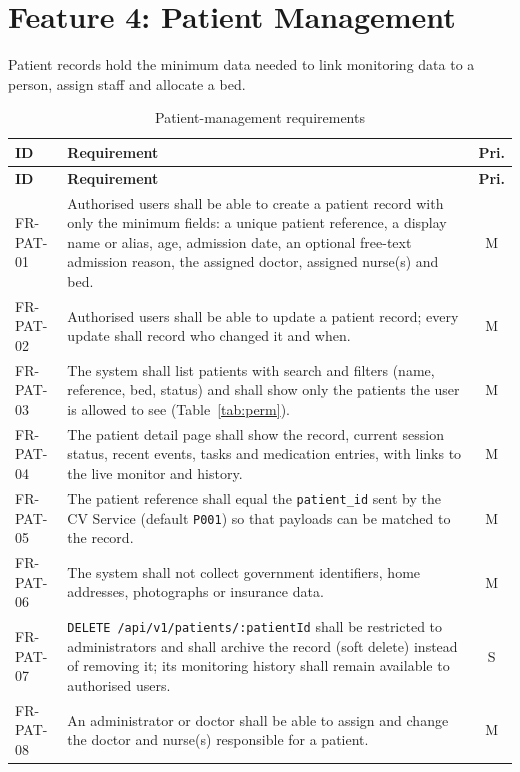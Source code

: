 \documentclass[a4paper,11pt]{scrreprt}
\makeatletter
\newenvironment{reqtable}[1]{%
  \small
  \begin{longtable}{@{}>{\ttfamily\footnotesize}p{2.55cm}>{\raggedright\arraybackslash}p{10.7cm}c@{}}
  \caption{#1}\\
  \toprule \textbf{ID} & \textbf{Requirement} & \textbf{Pri.}\\ \midrule
  \endfirsthead
  \toprule \textbf{ID} & \textbf{Requirement} & \textbf{Pri.}\\ \midrule
  \endhead
  \bottomrule
  \endfoot
}{%
  \end{longtable}\normalsize
}
\newcommand{\req}[3]{#1 & #2 & #3 \\ \midrule}
\newcommand{\code}[1]{\texttt{#1}}
\makeatother
\begin{document}
\section{Feature 4: Patient Management}
Patient records hold the minimum data needed to link monitoring data to a person, assign staff and allocate a bed.
\begin{reqtable}{Patient-management requirements}
\req{FR-PAT-01}{Authorised users shall be able to create a patient record with only the minimum fields: a unique patient reference, a display name or alias, age, admission date, an optional free-text admission reason, the assigned doctor, assigned nurse(s) and bed.}{M}
\req{FR-PAT-02}{Authorised users shall be able to update a patient record; every update shall record who changed it and when.}{M}
\req{FR-PAT-03}{The system shall list patients with search and filters (name, reference, bed, status) and shall show only the patients the user is allowed to see (Table~\ref{tab:perm}).}{M}
\req{FR-PAT-04}{The patient detail page shall show the record, current session status, recent events, tasks and medication entries, with links to the live monitor and history.}{M}
\req{FR-PAT-05}{The patient reference shall equal the \code{patient_id} sent by the CV Service (default \code{P001}) so that payloads can be matched to the record.}{M}
\req{FR-PAT-06}{The system shall not collect government identifiers, home addresses, photographs or insurance data.}{M}
\req{FR-PAT-07}{\code{DELETE /api/v1/patients/:patientId} shall be restricted to administrators and shall archive the record (soft delete) instead of removing it; its monitoring history shall remain available to authorised users.}{S}
\req{FR-PAT-08}{An administrator or doctor shall be able to assign and change the doctor and nurse(s) responsible for a patient.}{M}
\end{reqtable}
\end{document}
